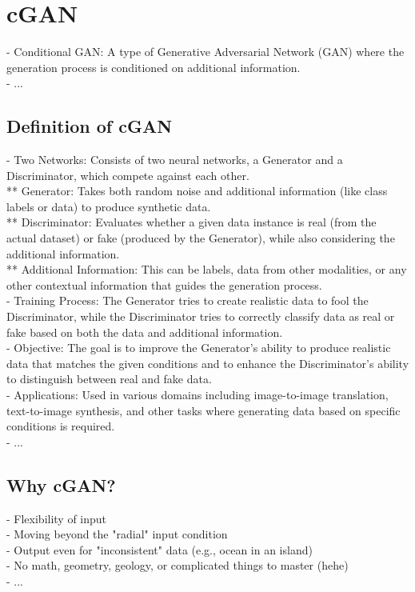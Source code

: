 \section{cGAN}
\label{sec:coral-island_cGAN}
- Conditional GAN: A type of Generative Adversarial Network (GAN) where the generation process is conditioned on additional information. \\
- ...

\subsection{Definition of cGAN}
- Two Networks: Consists of two neural networks, a Generator and a Discriminator, which compete against each other. \\
** Generator: Takes both random noise and additional information (like class labels or data) to produce synthetic data. \\
** Discriminator: Evaluates whether a given data instance is real (from the actual dataset) or fake (produced by the Generator), while also considering the additional information. \\
** Additional Information: This can be labels, data from other modalities, or any other contextual information that guides the generation process. \\
- Training Process: The Generator tries to create realistic data to fool the Discriminator, while the Discriminator tries to correctly classify data as real or fake based on both the data and additional information. \\
- Objective: The goal is to improve the Generator’s ability to produce realistic data that matches the given conditions and to enhance the Discriminator’s ability to distinguish between real and fake data. \\
- Applications: Used in various domains including image-to-image translation, text-to-image synthesis, and other tasks where generating data based on specific conditions is required. \\
- ...

\subsection{Why cGAN?}
- Flexibility of input \\
- Moving beyond the "radial" input condition \\
- Output even for "inconsistent" data (e.g., ocean in an island) \\
- No math, geometry, geology, or complicated things to master (hehe) \\
- ... 

